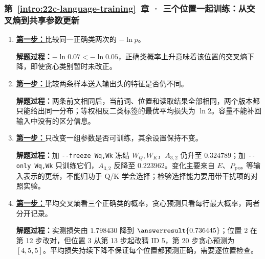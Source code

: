 \subsubsection*{第~\ref*{intro:22c-language-training}~章 · 三个位置一起训练：从交叉熵到共享参数更新}
\begin{enumerate}[label={},leftmargin=4.8em,itemsep=4pt]
\item[\textbf{C-075.}] \leavevmode{}\label{solution:C-075}\label{solution:correct-probability-loss}\hyperref[exercise:correct-probability-loss]{\textbf{第一步：}}比较同一正确类两次的 $-\ln p$。\par\nobreak\textbf{解题过程：}$-\ln0.07<-\ln0.05$，正确类概率上升意味着该位置的交叉熵下降，即使贪心类别暂时未改正。
\item[\textbf{C-076.}] \leavevmode{}\label{solution:C-076}\label{solution:context-conflicting-labels}\hyperref[exercise:context-conflicting-labels]{\textbf{第一步：}}比较两条样本送入输出头的特征是否仍不同。\par\nobreak\textbf{解题过程：}两条前文相同后，当前词、位置和读取结果全部相同，两个版本都只能给出同一分布；等权相反二类标签的最优平均损失为 $\ln2$。容量不能补回输入中没有的区分信息。
\item[\textbf{C-077.}] \leavevmode{}\label{solution:C-077}\label{solution:attention-attribution}\hyperref[exercise:attention-attribution]{\textbf{第一步：}}只改变一组参数是否可训练，其余设置保持不变。\par\nobreak\textbf{解题过程：}加 \texttt{-{}-freeze Wq,Wk} 冻结 $W_Q,W_K$，$A_{3,2}$ 仍升至 $0.324789$；加 \texttt{-{}-only Wq,Wk} 只训练它们，$A_{3,2}$ 反降至 $0.223962$。变化主要来自 $E$、$P_{\rm pos}$ 等输入表示的更新，不能归功于 Q/K 学会选择；检验选择能力要用带干扰项的对照实验。
\item[\textbf{C-078.}] \leavevmode{}\label{solution:C-078}\label{solution:frozen-output-head-training}\hyperref[exercise:frozen-output-head-training]{\textbf{第一步：}}平均交叉熵看三个正确类的概率，贪心预测只看每行最大概率，两者分开记录。\par\nobreak
\textbf{解题过程：}实测损失由 $1.798430$ 降到 $\answerresult{0.736445}$；位置 2 在第 12 步改对，但位置 3 从第 13 步起改猜 ID 5，第 20 步贪心预测为 $[4,5,5]$。平均损失持续下降不保证每个位置都预测正确，需要逐位置检查。

\end{enumerate}
